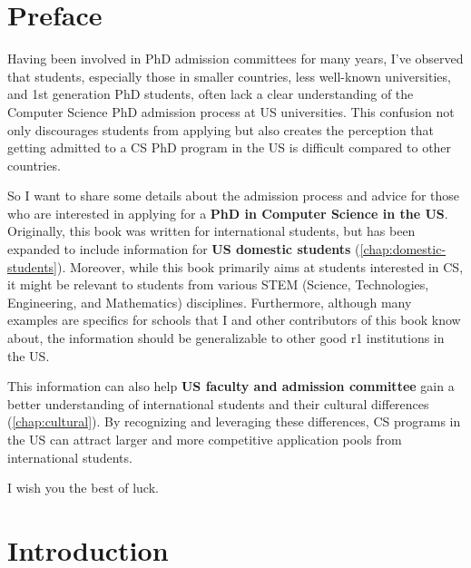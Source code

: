 \documentclass[oneside,11pt,dvipsnames]{book}
\begin{document}
\renewcommand{\contentsname}{Contents and Summary}
\tableofcontents


\chapter{Preface}

Having been involved in PhD admission committees for many years, I've observed that students, especially those in smaller countries, less well-known universities, and 1st generation PhD students, often lack a clear understanding of the Computer Science PhD admission process at US universities. This confusion not only discourages students from applying but also creates the perception that getting admitted to a CS PhD program in the US is difficult compared to other countries.

So I want to share some details about the admission process and advice for those who are interested in applying for a \textbf{PhD in Computer Science in the US}.
Originally, this book was written for international students, but has been expanded to include information for \textbf{US domestic students} (\autoref{chap:domestic-students}).
Moreover, while this book primarily aims at students interested in CS, it might be relevant to students from various \acrshort{STEM} (Science, Technologies, Engineering, and Mathematics) disciplines.
Furthermore, although many examples are specifics for schools that I and other contributors of this book know about, the information should be generalizable to other good \Gls{r1} institutions in the US.

This information can also help \textbf{US faculty and admission committee} gain a better understanding of international students and their cultural differences (\autoref{chap:cultural}).  By recognizing and leveraging these differences, CS programs in the US can attract larger and more competitive application pools from international students.

I wish you the best of luck.


\mainmatter

\chapter{Introduction}\label{part:intro}
\end{document}
